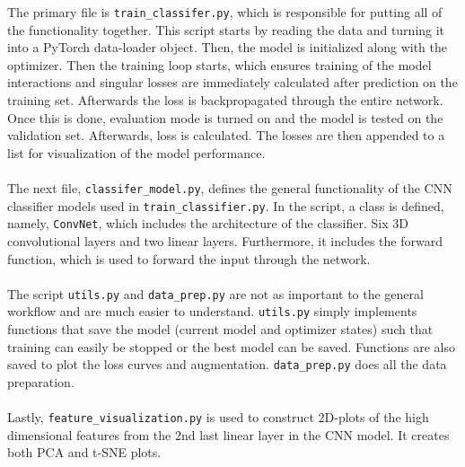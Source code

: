 \documentclass[11pt, fleqn, titlepage]{article}
\newcommand{\1}[1]{\mathds{1}\left[#1\right]}
\begin{document}
\noindent
The primary file is \texttt{train\_classifer.py}, which is responsible for putting all of the functionality together. This script starts by reading the data and turning it into a PyTorch data-loader object. Then, the model is initialized along with the optimizer. Then the training loop starts, which ensures training of the model interactions and singular losses are immediately calculated after prediction on the training set. Afterwards the loss is backpropagated through the entire network. Once this is done, evaluation mode is turned on and the model is tested on the validation set.  Afterwards, loss is calculated. The losses are then appended to a list for visualization of the model performance.
\\\\
The next file, \texttt{classifer\_model.py}, defines the general functionality of the CNN classifier models used in \texttt{train\_classifier.py}. In the script, a class is defined, namely, \texttt{ConvNet}, which includes the architecture of the classifier. Six 3D convolutional layers and two linear layers. Furthermore, it includes the forward function, which is used to forward the input through the network. 
\\\\
The script \texttt{utils.py} and \texttt{data\_prep.py} are not as important to the general workflow and are much easier to understand. \texttt{utils.py} simply implements functions that save the model (current model and optimizer states) such that training can easily be stopped or the best model can be saved. Functions are also saved to plot the loss curves and augmentation. \texttt{data\_prep.py} does all the data preparation.
\\\\
Lastly, \texttt{feature\_visualization.py} is used to construct 2D-plots of the high dimensional features from the 2nd last linear layer in the CNN model. It creates both PCA and t-SNE plots.
\end{document}

